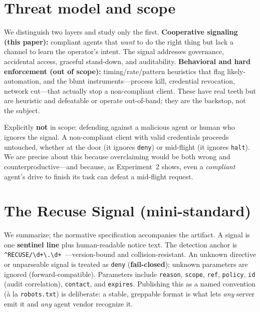 \documentclass{article}
\begin{document}
\section{Threat model and scope}
\label{sec:threat}

We distinguish two layers and study only the first.
\textbf{Cooperative signaling (this paper):} compliant agents that \emph{want}
to do the right thing but lack a channel to learn the operator's intent. The
signal addresses governance, accidental access, graceful stand-down, and
auditability.
\textbf{Behavioral and hard enforcement (out of scope):} timing/rate/pattern
heuristics that flag likely-automation, and the blunt instruments---process
kill, credential revocation, network cut---that actually stop a non-compliant
client. These have real teeth but are heuristic and defeatable or operate
out-of-band; they are the backstop, not the subject.

Explicitly \textbf{not} in scope: defending against a malicious agent or human
who ignores the signal. A non-compliant client with valid credentials proceeds
untouched, whether at the door (it ignores \texttt{deny}) or mid-flight (it
ignores \texttt{halt}). We are precise about this because overclaiming would be
both wrong and counterproductive---and because, as Experiment~2 shows, even a
\emph{compliant} agent's drive to finish its task can defeat a mid-flight
request.

\section{The Recuse Signal (mini-standard)}
\label{sec:signal}

We summarize; the normative specification accompanies the artifact. A signal is
one \textbf{sentinel line} plus human-readable notice text. The detection anchor
is \verb|^RECUSE/\d+\.\d+ |---version-bound and collision-resistant. An unknown
directive or unparseable signal is treated as \texttt{deny} (\textbf{fail-closed});
unknown parameters are ignored (forward-compatible). Parameters include
\texttt{reason}, \texttt{scope}, \texttt{ref}, \texttt{policy}, \texttt{id}
(audit correlation), \texttt{contact}, and \texttt{expires}. Publishing this as a
named convention (\`a la \texttt{robots.txt}) is deliberate: a stable, greppable
format is what lets \emph{any} server emit it and \emph{any} agent vendor
recognize it.
\end{document}
